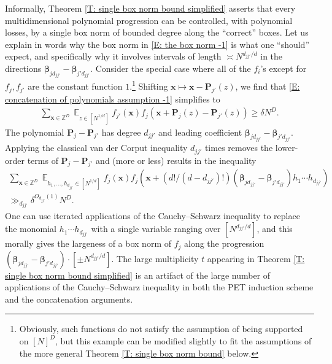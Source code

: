 \documentclass[11pt]{amsart}
\theoremstyle{definition}
\DeclareMathOperator*{\E}{\mathbb{E}}
\newcommand{\Z}{{\mathbb Z}}
\newcommand{\bp}{{\mathbf{P}}}
\newcommand{\bx}{{\mathbf{x}}}
\newcommand{\bbeta}{{\boldsymbol{\beta}}}
\begin{document}
Informally, Theorem \ref{T: single box norm bound simplified} asserts that every multidimensional polynomial progression can be controlled, with polynomial losses, by a single box norm of bounded degree along the ``correct'' boxes. Let us explain in words why the box norm in \eqref{E: the box norm -1} is what one ``should'' expect, and specifically why it involves intervals of length $\asymp N^{d_{jj'}/d}$ in the directions $\bbeta_{jd_{jj'}}-\bbeta_{j'd_{jj'}}$.   
Consider the special case where
all of the $f_i$'s except for $f_j, f_{j'}$ are the constant function $1$.\footnote{Obviously, such functions do not satisfy the assumption of being supported on $[N]^D$, but this example can be modified slightly to fit the assumptions of the more general Theorem \ref{T: single box norm bound} below.}  Shifting $\bx\mapsto \bx - \bp_{j'}(z)$, we find that \eqref{E: concatenation of polynomials assumption -1} simplifies to 
\begin{align*}
\sum_{\bx\in\Z^D}\E_{z\in[N^{1/d}]}f_{j'}(\bx)f_j(\bx + \bp_j(z) - \bp_{j'}(z)) \geq \delta N^D.
\end{align*}
The polynomial $\bp_j - \bp_{j'}$ has degree $d_{jj'}$ and leading coefficient $\bbeta_{jd_{jj'}}-\bbeta_{j'd_{jj'}}$.
Applying the classical van der Corput inequality $d_{jj'}$ times removes the lower-order terms of $\bp_j - \bp_{j'}$
and (more or less) results in the inequality
\begin{multline*}
    \sum_{\bx\in\Z^D}\E_{h_1, \ldots, h_{d_{jj'}}\in [N^{1/d}]}f_j(\bx)f_j(\bx + (d!/{(d-d_{jj'})!})(\bbeta_{jd_{jj'}} -\bbeta_{j'd_{jj'}})h_1\cdots h_{d_{jj'}})\\
    \gg_{d_{jj'}}\delta^{O_{d_{jj'}}(1)}N^D.
\end{multline*}
One can use iterated applications of the Cauchy--Schwarz inequality to replace the monomial $h_1\cdots h_{d_{jj'}}$ with a single variable ranging over $[N^{d_{jj'}/d}]$, and this morally gives the largeness of a box norm of $f_j$ along the progression $(\bbeta_{jd_{jj'}}-\bbeta_{j'd_{jj'}})\cdot[\pm N^{d_{jj'}/d}]$.  The large multiplicity $t$ appearing in Theorem \ref{T: single box norm bound simplified} is an artifact of the large number of applications of the Cauchy--Schwarz inequality in both the PET induction scheme and the concatenation arguments.
\end{document}
